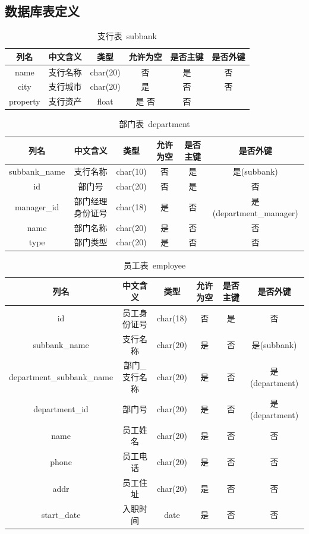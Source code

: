\documentclass{article}
\begin{document}
    \subsection{数据库表定义}
    \begin{table}[H]
        \centering
        \caption{支行表\ subbank}
        \begin{tabular}{cccccc}
            \hline
            列名 & 中文含义 & 类型 & 允许为空 & 是否主键 & 是否外键 \\
            \hline
            name & 支行名称 & char(20) & 否 & 是 & 否 \\
            city & 支行城市 & char(20) & 是 & 否 & 否 \\
            property & 支行资产 & float & 是 否 & 否 \\
            \hline
        \end{tabular}
    \end{table}
    \begin{table}[H]
        \centering
        \caption{部门表\ department}
        \begin{tabular}{cccccc}
            \hline
            列名 & 中文含义 & 类型 & 允许为空 & 是否主键 & 是否外键 \\
            \hline
            subbank\_name & 支行名称 & char(10) & 否 & 是 & 是(subbank) \\
            id & 部门号 & char(20) & 否 & 是 & 否 \\
            manager\_id & 部门经理身份证号 & char(18) & 是 & 否 & 是(department\_manager) \\
            name & 部门名称 & char(20) & 是 & 否 & 否 \\
            type & 部门类型 & char(20) & 是 & 否 & 否 \\
            \hline
        \end{tabular}
    \end{table}
    \begin{table}[H]
        \centering
        \caption{员工表\ employee}
        \begin{tabular}{cccccc}
            \hline
            列名 & 中文含义 & 类型 & 允许为空 & 是否主键 & 是否外键 \\
            \hline
            id & 员工身份证号 & char(18) & 否 & 是 & 否 \\
            subbank\_name & 支行名称 & char(20) & 是 & 否 & 是(subbank) \\
            department\_subbank\_name & 部门\_支行名称 & char(20) & 是 & 否 & 是(department) \\
            department\_id & 部门号 & char(20) & 是 & 否 & 是(department) \\
            name & 员工姓名 & char(20) & 是 & 否 & 否 \\
            phone & 员工电话 & char(20) & 是 & 否 & 否 \\
            addr & 员工住址 & char(20) & 是 & 否 & 否 \\
            start\_date & 入职时间 & date & 是 & 否 & 否 \\
            \hline
        \end{tabular}
    \end{table}
\end{document}
